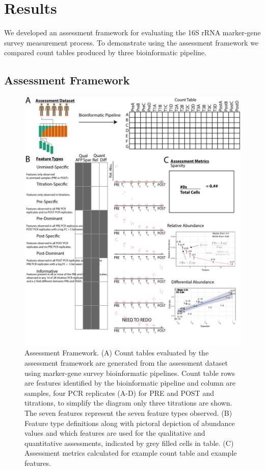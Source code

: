 \documentclass{bmcart}
\begin{document}
\section*{Results}
We developed an assessment framework for evaluating the 16S rRNA marker-gene survey measurement process.
To demonstrate using the assessment framework we compared count tables produced by three bioinformatic pipeline.


\subsection*{Assessment Framework}
\begin{figure}
\centering
\includegraphics{AssessmentFramework.pdf}
\caption{\label{fig:assessmentFramework}Assessment Framework. (A) Count tables evaluated by the assessment framework are generated from the assessment dataset using marker-gene survey bioinformatic pipelines. Count table rows are features identified by the bioinformatic pipeline and column are samples, four PCR replicates (A-D) for PRE and POST and titrations, to simplify the diagram only three titrations are shown.  The seven features represent the seven feature types observed. (B) Feature type definitions along with pictoral depiction of abundance values and which features are used for the qualitative and quantitative assessments, indicated by grey filled cells in table. (C) Assessment metrics calculated for example count table and example features.}
\end{figure}
\end{document}

